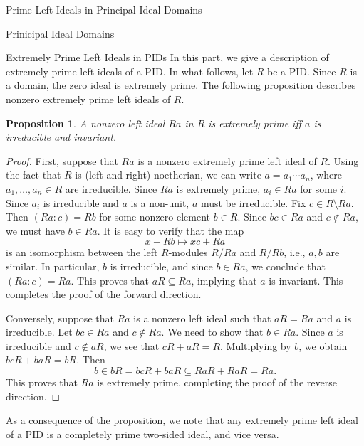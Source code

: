\documentclass[11pt,a4paper]{article}
\theoremstyle{theorem}
\newtheorem{proposition}[theorem]{Proposition}
\numberwithin{equation}{section}
\begin{document}
\begin{section}{Prime Left Ideals in Principal Ideal Domains}
\begin{subsection}{Prinicipal Ideal Domains}
 	
\end{subsection}

	\begin{subsection}{Extremely Prime Left Ideals in PIDs}
	In this part, we give a description of extremely prime left ideals of a PID. In what follows, let \(R\) be a PID. Since \( R \) is a domain, the zero ideal is extremely prime. The following proposition describes nonzero extremely prime left ideals of \(R\).
	\begin{proposition}\label{prop: extremeply prime ideal of PID }
		A nonzero left ideal \( Ra \) in \( R \) is extremely prime iff \(a\) is irreducible and invariant.
	\end{proposition}
	\begin{proof}
		
		First, suppose that \(  Ra \) is a nonzero extremely prime left ideal of  \( R \). Using the fact that \(R\) is (left and right) noetherian, we can write \( a = a_1\cdots a_n\), where \(a_1,\dots,a_n\in R\) are irreducible. Since \(Ra\) is extremely prime, \(a_i\in Ra\) for some \(i\).  Since \(a_i\) is irreducible and \(a\) is a non-unit,  \( a \) must be irreducible. 
		Fix \(c\in R\setminus Ra\).  Then \((Ra : c) = Rb\) for some nonzero element \( b\in R\). Since \(bc\in Ra\) and \(c\notin Ra\), we must have \( b \in Ra \). It is easy to verify that the map 
		\[
		x+Rb\mapsto xc+Ra 
		\]
		is an isomorphism between
		the left \(R\)-modules \(R/Ra\) and \(R/Rb\), i.e., \(a,b\) are similar. In particular, \(b\) is irreducible, and since \(b\in Ra\), we conclude that \((Ra : c)=Ra\). This proves that  \(aR\subseteq Ra\), implying that \(a\) is invariant. This completes the proof of the forward direction.
		
		Conversely, suppose that \(Ra\) is a nonzero left ideal such that \(aR = Ra\) and  \(a\) is irreducible. Let \(bc\in Ra\) and \(c\notin Ra\). We need to show that \(b\in Ra\). Since \(a\) is irreducible and \(c\notin aR\), we see that \(cR+aR=R\). Multiplying by \(b\), we obtain \(bcR+baR=bR\). Then
		\[
			b\in bR = bcR+baR \subseteq RaR + RaR = Ra.
		\] 
		This proves that 
		\(Ra\) is extremely prime, completing the proof of the reverse direction. 
	\end{proof}
	As a consequence of the proposition, we note that any extremely prime left ideal of a PID is a completely prime two-sided ideal, and vice versa. 
	

\end{subsection}
\end{section}
\end{document}
